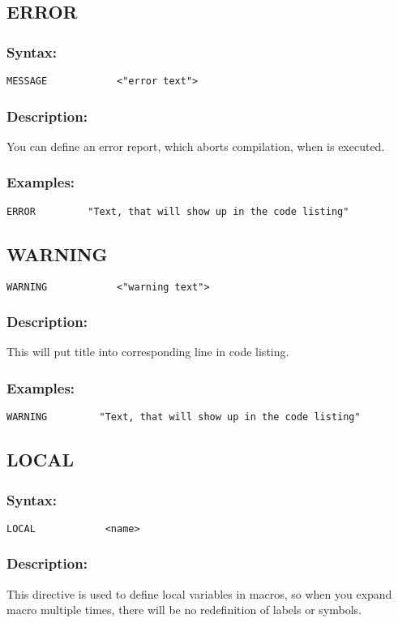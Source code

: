     \subsection{ERROR}
        \subsubsection{Syntax:}
            \verb'MESSAGE            <"error text">'

        \subsubsection{Description:}
        You can define an error report, which aborts compilation, when is executed.

        \subsubsection{Examples:}
        {
            \usecodefont
            \verb'ERROR         "Text, that will show up in the code listing"'
        }

    \subsection{WARNING}
            \verb'WARNING            <"warning text">'

        \subsubsection{Description:}
            This will put title into corresponding line in code listing.

        \subsubsection{Examples:}
        {
            \usecodefont
            \verb'WARNING         "Text, that will show up in the code listing"'
        }

    \subsection{LOCAL}
        \subsubsection{Syntax:}
            \verb'LOCAL            <name>'

        \subsubsection{Description:}
            This directive is used to define local variables in macros, so when you expand macro multiple times, there will be no redefinition of labels or symbols.

